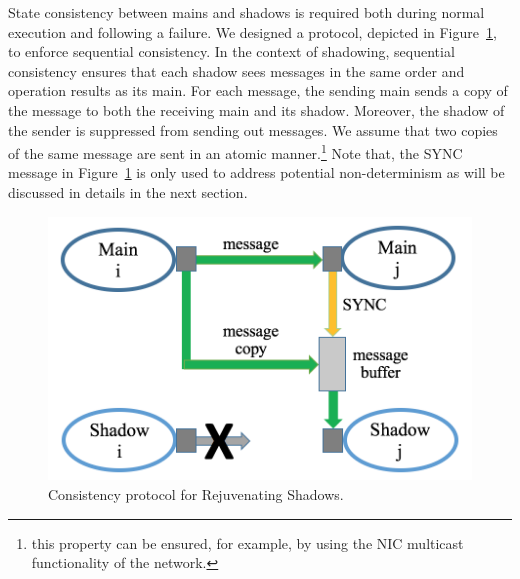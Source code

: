 
State consistency between mains and shadows is required both during normal execution and following a failure. %
We designed a protocol, depicted in Figure~\ref{fig:cons_protocol}, 
to enforce sequential consistency. In the context of shadowing, sequential consistency ensures that each shadow sees messages in the same order and operation results as its main. 
For each message, the sending main sends a copy of the message to both the receiving main and its shadow. Moreover, the shadow of the sender is suppressed from sending out messages. We assume that two copies of the same message are sent in an atomic manner.\footnote{this property can be ensured, for example, by using the NIC multicast functionality of the network.}
Note that, the SYNC message in Figure~\ref{fig:cons_protocol} is only used to address potential non-determinism as will be discussed in details in the next section.


\begin{figure}[!t]
  \begin{center}
      	\includegraphics[width=0.7\columnwidth]{figures/consistency}
  \end{center}
  \caption{Consistency protocol for Rejuvenating Shadows.}
  \label{fig:cons_protocol}
\end{figure}


